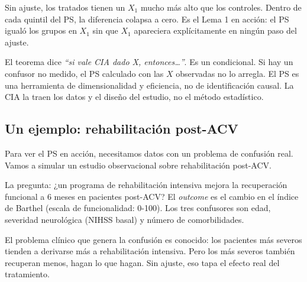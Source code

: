 \documentclass[
  letterpaper,
  DIV=11,
  numbers=noendperiod,
  oneside]{scrreprt}
\begin{document}
Sin ajuste, los tratados tienen un \(X_1\) mucho más alto que los
controles. Dentro de cada quintil del PS, la diferencia colapsa a cero.
Es el Lema 1 en acción: el PS igualó los grupos en \(X_1\) sin que
\(X_1\) apareciera explícitamente en ningún paso del ajuste.

\begin{tcolorbox}[enhanced jigsaw, breakable, rightrule=.15mm, colbacktitle=quarto-callout-warning-color!10!white, bottomtitle=1mm, arc=.35mm, titlerule=0mm, left=2mm, toprule=.15mm, leftrule=.75mm, colback=white, opacitybacktitle=0.6, opacityback=0, colframe=quarto-callout-warning-color-frame, bottomrule=.15mm, coltitle=black, toptitle=1mm, title=\textcolor{quarto-callout-warning-color}{\faExclamationTriangle}\hspace{0.5em}{Lo que el \emph{propensity score} no es}]
El teorema dice \emph{``si vale CIA dado X, entonces\ldots{}''}. Es un
condicional. Si hay un confusor no medido, el PS calculado con las \(X\)
observadas no lo arregla. El PS es una herramienta de dimensionalidad y
eficiencia, no de identificación causal. La CIA la traen los datos y el
diseño del estudio, no el método estadístico.
\end{tcolorbox}

\hypertarget{un-ejemplo-rehabilitaciuxf3n-post-acv}{%
\subsection{Un ejemplo: rehabilitación
post-ACV}\label{un-ejemplo-rehabilitaciuxf3n-post-acv}}

Para ver el PS en acción, necesitamos datos con un problema de confusión
real. Vamos a simular un estudio observacional sobre rehabilitación
post-ACV.

La pregunta: ¿un programa de rehabilitación intensiva mejora la
recuperación funcional a 6 meses en pacientes post-ACV? El
\emph{outcome} es el cambio en el índice de Barthel (escala de
funcionalidad: 0-100). Los tres confusores son edad, severidad
neurológica (NIHSS basal) y número de comorbilidades.

El problema clínico que genera la confusión es conocido: los pacientes
más severos tienden a derivarse más a rehabilitación intensiva. Pero los
más severos también recuperan menos, hagan lo que hagan. Sin ajuste, eso
tapa el efecto real del tratamiento.
\end{document}
